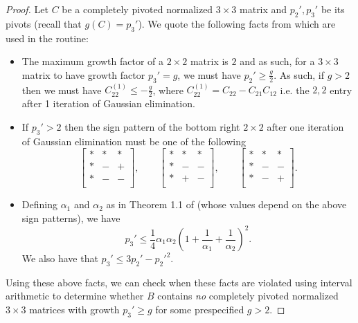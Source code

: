 \documentclass[reqno]{amsart}
\numberwithin{equation}{section}
\begin{document}
\begin{proof}
    Let $C$ be a completely pivoted normalized $3 \times 3$ matrix and $p_2', p_3'$ be its pivots (recall that $g(C) = p_3'$). We quote the following facts from \cite{cohen1974note} which are used in the routine:
    \begin{itemize}
        \item The maximum growth factor of a $2 \times 2$ matrix is $2$ and as such, for a $3 \times 3$ matrix to have growth factor $p_3' = g$, we must have $p_2' \geq \frac g2$. As such, if $g > 2$ then we must have $C_{22}^{(1)} \leq -\frac g2$, where $C_{22}^{(1)} = C_{22} - C_{21} C_{12}$ i.e. the $2,2$ entry after 1 iteration of Gaussian elimination.
        \item If $p_3' > 2$ then the sign pattern of the bottom right $2 \times 2$ after one iteration of Gaussian elimination must be one of the following 
        \begin{equation*}
            \begin{bmatrix}
                * & * & * \\
                * & - & + \\
                * & - & - \\
            \end{bmatrix},
            \qquad
            \begin{bmatrix}
                * & * & * \\
                * & - & - \\
                * & + & - \\
            \end{bmatrix},
            \qquad
            \begin{bmatrix}
                * & * & * \\
                * & - & - \\
                * & - & + \\
            \end{bmatrix}.
        \end{equation*}
        \item Defining $\alpha_1$ and $\alpha_2$ as in Theorem 1.1 of \cite{cohen1974note} (whose values depend on the above sign patterns), we have
        \begin{equation*}
            p_3' \leq \frac 14 \alpha_1 \alpha_2 \left(
                1 + \frac{1}{\alpha_1} + \frac{1}{\alpha_2}
            \right)^2.
        \end{equation*} 
        We also have that $p_3' \leq 3p_2' - p_2'^2$.
    \end{itemize}
    Using these above facts, we can check when these facts are violated using interval arithmetic to determine whether $B$ contains \textit{no} completely pivoted normalized $3 \times 3$ matrices with growth $p_3' \geq g$ for some prespecified $g>2$.


\end{proof}
\end{document}
